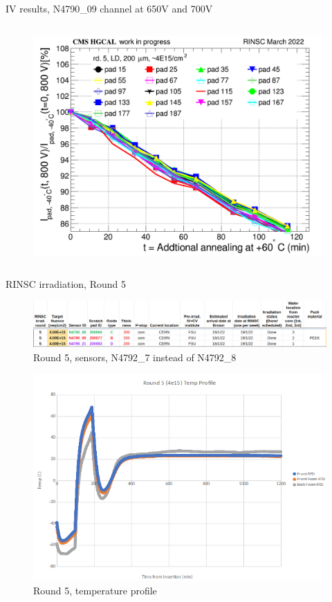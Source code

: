 \documentclass{beamer}
\begin{document}
\begin{frame}{IV results, N4790\_09 channel at 650V and 700V}
  \begin{columns}
       \begin{figure}
           \includegraphics[width=1.0\textwidth]{plots/8in_198ch_2019_N4790_21_4E15_neg40degC_annealing_current_800.png}
       \end{figure}
   \end{columns}
\end{frame}



\begin{frame}{RINSC irradiation, Round 5}
    \begin{figure}
        \includegraphics[width=.7\textwidth]{plots/Round_5_sensors.png}
        \caption{Round 5, sensors, N4792\_7 instead of N4792\_8}
    \end{figure}
    \begin{figure}
      \includegraphics[width=.5\textwidth]{plots/Round5_temp_profile.png}
      \caption{Round 5, temperature profile}
    \end{figure}
\end{frame}
\end{document}
